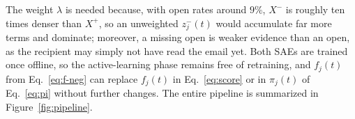 The weight $\lambda$ is needed because, with open rates around $9\%$,
$X^{-}$ is roughly ten times denser than $X^{+}$, so an unweighted
$z^{-}_j(t)$ would accumulate far more terms and dominate; moreover, a
missing open is weaker evidence than an open, as the recipient may simply not
have read the email yet. Both SAEs are trained once offline, so the
active-learning phase remains free of retraining, and $f_j(t)$ from
Eq.~\eqref{eq:f-neg} can replace $f_j(t)$ in Eq.~\eqref{eq:score} or in
$\pi_j(t)$ of Eq.~\eqref{eq:pi} without further changes.
The entire pipeline is summarized in Figure~\ref{fig:pipeline}.
